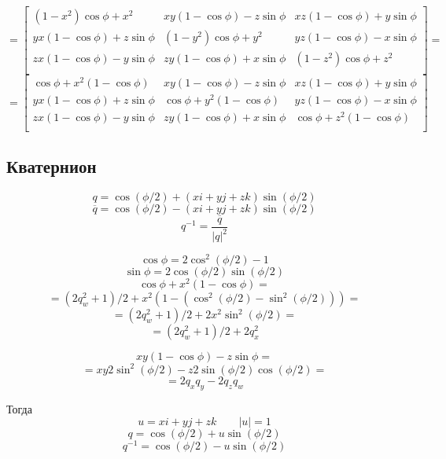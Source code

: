 \[
    =
    \begin{bmatrix}
        (1 - x^2) \cos \phi + x^2 &
        x y (1 - \cos \phi) - z \sin \phi &
        x z (1 - \cos \phi) + y \sin \phi \\
        y x (1 - \cos \phi) + z \sin \phi &
        (1 - y^2) \cos \phi + y^2 &
        y z (1 - \cos \phi) - x \sin \phi \\
        z x (1 - \cos \phi) - y \sin \phi &
        z y (1 - \cos \phi) + x \sin \phi &
        (1 - z^2) \cos \phi + z^2 \\
    \end{bmatrix} =
\]
\[
    =
    \begin{bmatrix}
        \cos \phi + x^2 (1 - \cos \phi) &
        x y (1 - \cos \phi) - z \sin \phi &
        x z (1 - \cos \phi) + y \sin \phi \\
        y x (1 - \cos \phi) + z \sin \phi &
        \cos \phi + y^2 (1 - \cos \phi) &
        y z (1 - \cos \phi) - x \sin \phi \\
        z x (1 - \cos \phi) - y \sin \phi &
        z y (1 - \cos \phi) + x \sin \phi &
        \cos \phi + z^2 (1 - \cos \phi) \\
    \end{bmatrix}
\]

\subsection{Кватернион}
\[ q = \cos(\phi / 2) + (xi + yj + zk) \sin(\phi / 2) \]
\[ \overline{q} = \cos(\phi / 2) - (xi + yj + zk) \sin(\phi / 2) \]
\[ q^{-1} = \frac{\overline{q}}{|q|^2} \]

\[ \cos \phi = 2 \cos^2 (\phi / 2) - 1 \]
\[ \sin \phi = 2 \cos(\phi / 2) \sin(\phi / 2) \]
\[ \cos \phi + x^2 (1 - \cos \phi) = \]
\[ = (2 q_w^2 + 1) / 2 + x^2 (1 - (\cos^2 (\phi / 2) - \sin^2 (\phi / 2))) = \]
\[ = (2 q_w^2 + 1) / 2 + 2 x^2 \sin^2 (\phi / 2) = \]
\[ = (2 q_w^2 + 1) / 2 + 2 q_x^2 \]

\[ x y (1 - \cos \phi) - z \sin \phi = \]
\[ = x y 2 \sin^2 (\phi / 2) - z 2 \sin (\phi / 2) \cos (\phi / 2) = \]
\[ = 2 q_x q_y - 2 q_z q_w \]

Тогда
\[ u = xi + yj + zk \quad \quad |u| = 1 \]
\[ q = \cos(\phi / 2) + u \sin(\phi / 2) \]
\[ q^{-1} = \cos(\phi / 2) - u \sin(\phi / 2) \]

